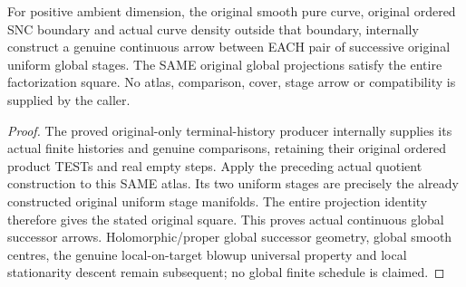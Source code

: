 \begin{theorem}
\label{hir:sharp-actual-curve-original-global-successor-map}
\leanok
For positive ambient dimension, the original smooth pure curve, original
ordered SNC boundary and actual curve density outside that boundary,
internally construct a genuine continuous arrow between EACH pair of
successive original uniform global stages. The SAME original global
projections satisfy the entire factorization square. No atlas, comparison,
cover, stage arrow or compatibility is supplied by the caller.
\end{theorem}
\begin{proof}
The proved original-only terminal-history producer internally supplies its
actual finite histories and genuine comparisons, retaining their original
ordered product TESTs and real empty steps. Apply the preceding actual
quotient construction to this SAME atlas. Its two uniform stages are
precisely the already constructed original uniform stage manifolds.
The entire projection identity therefore gives the stated original square.
This proves actual continuous global successor arrows. Holomorphic/proper
global successor geometry, global smooth centres, the genuine local-on-target
blowup universal property and local stationarity descent remain subsequent;
no global finite schedule is claimed.
\end{proof}
